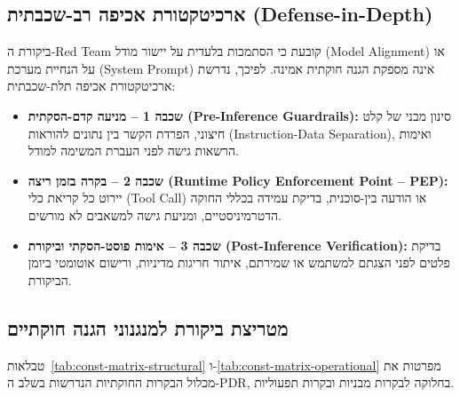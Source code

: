 \subsection{ארכיטקטורת אכיפה רב-שכבתית (\textenglish{Defense-in-Depth})}
ביקורת ה-\textenglish{Red Team} קובעת כי הסתמכות בלעדית על יישור מודל (\textenglish{Model Alignment}) או על הנחיית מערכת (\textenglish{System Prompt}) אינה מספקת הגנה חוקתית אמינה. לפיכך, נדרשת ארכיטקטורת אכיפה תלת-שכבתית:
\begin{itemize}
    \item \textbf{שכבה 1 -- מניעה קדם-הסקתית (\textenglish{Pre-Inference Guardrails}):} סינון מבני של קלט חיצוני, הפרדת הקשר בין נתונים להוראות (\textenglish{Instruction-Data Separation}), ואימות הרשאות גישה לפני העברת המשימה למודל.
    \item \textbf{שכבה 2 -- בקרה בזמן ריצה (\textenglish{Runtime Policy Enforcement Point -- PEP}):} יירוט כל קריאת כלי (\textenglish{Tool Call}) או הודעה בין-סוכנית, בדיקת עמידה בכללי החוקה הדטרמיניסטיים, ומניעת גישה למשאבים לא מורשים.
    \item \textbf{שכבה 3 -- אימות פוסט-הסקתי וביקורת (\textenglish{Post-Inference Verification}):} בדיקת פלטים לפני הצגתם למשתמש או שמירתם, איתור חריגות מדיניות, ורישום אוטומטי ביומן הביקורת.
\end{itemize}

\subsection{מטריצת ביקורת למנגנוני הגנה חוקתיים}
טבלאות~\ref{tab:const-matrix-structural} ו-\ref{tab:const-matrix-operational} מפרטות את מכלול הבקרות החוקתיות הנדרשות בשלב ה-\textenglish{PDR}, בחלוקה לבקרות מבניות ובקרות תפעוליות.

